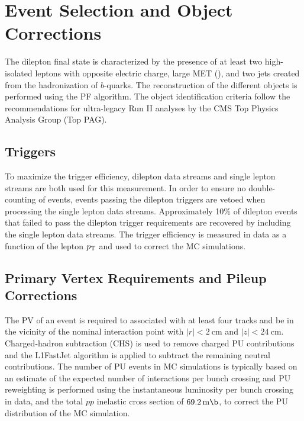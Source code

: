 \section{Event Selection and Object Corrections}
The \ttbar dilepton final state is characterized by the presence of at least two high-\pT isolated leptons with opposite electric charge, large MET (\ETmiss), and two jets created from the hadronization of $b$-quarks.
The reconstruction of the different objects is performed using the PF algorithm.
The object identification criteria follow the recommendations for ultra-legacy Run II analyses by the CMS Top Physics Analysis Group (Top PAG).

\subsection{Triggers}
To maximize the trigger efficiency, dilepton data streams and single lepton streams are both used for this measurement.
In order to ensure no double-counting of events, events passing the dilepton triggers are vetoed when processing the single lepton data streams.
Approximately 10\% of dilepton events that failed to pass the dilepton trigger requirements are recovered by including the single lepton data streams.
The trigger efficiency is measured in data as a function of the lepton $p_{\mathrm{T}}$ and used to correct the MC simulations.

\subsection{Primary Vertex Requirements and Pileup Corrections}
The PV of an event is required to associated with at least four tracks and be in the vicinity of the nominal interaction point with $\vert r \vert < \SI{2}{\cm}$ and $\vert z \vert < \SI{24}{\cm}$. 
Charged-hadron subtraction (CHS) is used to remove charged PU contributions and the L1FastJet algorithm is applied to subtract the remaining neutral contributions.
The number of PU events in MC simulations is typically based on an estimate of the expected number of interactions per bunch crossing and PU reweighting is performed using the instantaneous luminosity per bunch crossing in data, and the total $pp$ inelastic cross section of $\SI{69.2}{\m \b}$, to correct the PU distribution of the MC simulation.


